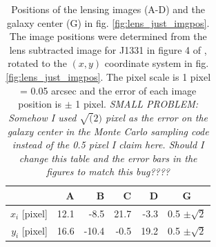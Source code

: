 \begin{table}
\centering
\begin{minipage}{70mm}
\begin{tabular}{r|rrrr|c}
\hline
  & A & B & C & D & G\\\hline
$x_i$ [pixel] & 12.1 & -8.5 & 21.7 & -3.3 & 0.5 $\pm \sqrt{2}$ \\
$y_i$ [pixel] & 16.6 & -10.4 & -0.5 & 19.2 & 0.5 $\pm \sqrt{2}$ \\
\hline
\end{tabular}
\caption{Positions of the lensing images (A-D) and the galaxy center (G) in fig. \ref{fig:lens_just_imgpos}. The image positions were determined from the lens subtracted image for J1331 in figure 4 of \citet{SWELLSIII}, rotated to the $(x,y)$ coordinate system in fig. \ref{fig:lens_just_imgpos}. The pixel scale is 1 pixel = 0.05 arcsec and the error of each image position is $\pm$ 1 pixel. \textit{SMALL PROBLEM: Somehow I used $\sqrt(2)$ pixel as the error on the galaxy center in the Monte Carlo sampling code instead of the 0.5 pixel I claim here. Should I change this table and the error bars in the figures to match this bug????}}
\label{tab:lenspos}
\end{minipage}
\end{table}


